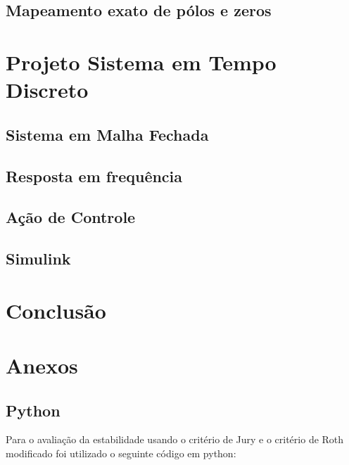 \documentclass[a4paper,11pt]{article}
\begin{document}
\subsection{Mapeamento exato de pólos e zeros}


\section{Projeto Sistema em Tempo Discreto}
\subsection{Sistema em Malha Fechada}
\subsection{Resposta em frequência}
\subsection{Ação de Controle}
\subsection{Simulink}
\subsection{}

\section{Conclusão}


\nocite{sympy}



\section{Anexos}
\subsection{Python}

Para o avaliação da estabilidade usando o critério de Jury e o critério de Roth modificado foi utilizado o seguinte código em python:
\end{document}
